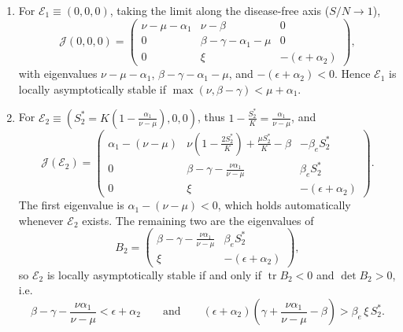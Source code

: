 \documentclass[12pt,a4paper,reqno]{amsart}
\theoremstyle{definition}
\theoremstyle{remark}
\theoremstyle{plain}
\begin{document}
\begin{enumerate}
\item For $\mathcal{E}_{1}\equiv(0,0,0)$, taking the limit along the disease-free axis ($S/N\to1$),
$$
\mathcal{J}(0,0,0)=
\begin{pmatrix}
\nu-\mu-\alpha_1 & \nu-\beta & 0\\[4pt]
0 & \beta-\gamma-\alpha_1-\mu & 0\\[4pt]
0 & \xi & -(\epsilon+\alpha_2)
\end{pmatrix},
$$
with eigenvalues $\nu-\mu-\alpha_1$, $\beta-\gamma-\alpha_1-\mu$, and $-(\epsilon+\alpha_2)<0$. Hence $\mathcal{E}_1$ is locally asymptotically stable if $\max\left(\nu, \beta-\gamma\right)<\mu+\alpha_1$.

\item For $\mathcal{E}_2\equiv\left(S_2^{*}=K\left(1-\frac{\alpha_1}{\nu-\mu}\right),0,0\right)$, thus
$1-\frac{S_2^{*}}{K}=\frac{\alpha_1}{\nu-\mu}$, and
$$
\mathcal{J}(\mathcal{E}_2)=
\begin{pmatrix}
\alpha_1-(\nu-\mu)
&
\nu\left(1-\frac{2S_2^{*}}{K}\right)+\frac{\mu S_2^{*}}{K}-\beta
&
-\beta_e S_2^{*}
\\[4pt]
0
&
\beta-\gamma-\frac{\nu\alpha_1}{\nu-\mu}
&
\beta_e S_2^{*}
\\[4pt]
0 & \xi & -(\epsilon+\alpha_2)
\end{pmatrix}.
$$
The first eigenvalue is $\alpha_1-(\nu-\mu)<0$, which holds automatically whenever $\mathcal{E}_2$ exists. The remaining two are the eigenvalues of
$$
B_2=
\begin{pmatrix}
\beta-\gamma-\frac{\nu\alpha_1}{\nu-\mu} & \beta_e S_2^{*}\\[4pt]
\xi & -(\epsilon+\alpha_2)
\end{pmatrix},
$$
so $\mathcal{E}_2$ is locally asymptotically stable if and only if $\operatorname{tr}B_2<0$ and
$\det B_2>0$, i.e.
$$
\beta-\gamma-\frac{\nu\alpha_1}{\nu-\mu}<\epsilon+\alpha_2
\qquad\text{and}\qquad
(\epsilon+\alpha_2)\left(\gamma+\frac{\nu\alpha_1}{\nu-\mu}-\beta\right)>\beta_e\,\xi\,S_2^{*}.
$$
\end{enumerate}
\end{document}
